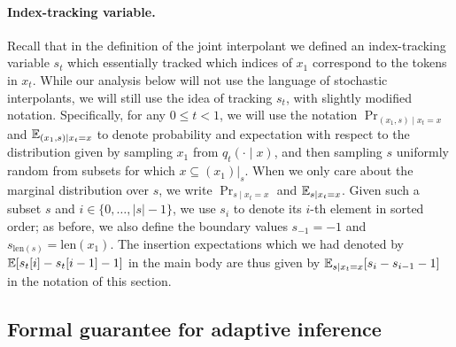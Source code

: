 \paragraph{Index-tracking variable.} Recall that in the definition of the joint interpolant we defined an index-tracking variable $s_t$ which essentially tracked which indices of $x_1$ correspond to the tokens in $x_t$. While our analysis below will not use the language of stochastic interpolants, we will still use the idea of tracking $s_t$, with slightly modified notation. Specifically, for any $0 \le t < 1$, we will use the notation $\Pr_{(x_1, s) \mid x_t = x}$ and $\mathbb{E}_{(x_1, s) \mid x_t = x}$ to denote probability and expectation with respect to the distribution given by sampling $x_1$ from $q_t(\cdot \mid x)$, and then sampling $s$ uniformly random from subsets for which $x\subseteq (x_1)|_s$. When we only care about the marginal distribution over $s$, we write $\Pr_{s\mid x_t = x}$ and $\mathbb{E}_{s\mid x_t = x}$. Given such a subset $s$ and $i\in\{0,\ldots,|s|-1\}$, we use $s_i$ to denote its $i$-th element in sorted order; as before, we also define the boundary values $s_{-1} = -1$ and $s_{\mathrm{len}(s)} = \mathrm{len}(x_1)$. The insertion expectations which we had denoted by $\mathbb{E}[s_t[i] - s_t[i-1] - 1]$ in the main body are thus given by $\mathbb{E}_{s\mid x_t = x}[s_i - s_{i-1} - 1]$ in the notation of this section.

\subsection{Formal guarantee for adaptive inference}

